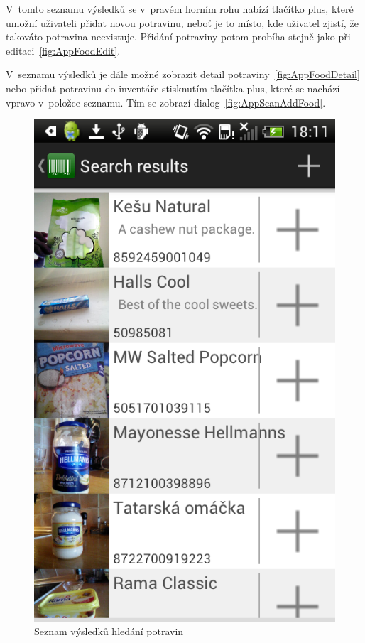 \documentclass[thesis=B,czech]{FITthesis}[2013/10/20]
\begin{document}
V~tomto seznamu výsledků se v~pravém horním rohu nabízí tlačítko plus, které umožní uživateli přidat novou potravinu, neboť je to místo, kde uživatel zjistí, že takováto potravina neexistuje. Přidání potraviny potom probíha stejně jako při editaci~\ref{fig:AppFoodEdit}.

V~seznamu výsledků je dále možné zobrazit detail potraviny~\ref{fig:AppFoodDetail} nebo přidat potravinu do inventáře stisknutím tlačítka plus, které se nachází vpravo v~položce seznamu. Tím se zobrazí dialog~\ref{fig:AppScanAddFood}.

\begin{figure}[H]
  \centering
  \includegraphics[scale=0.4]{screenshots/app_search_results.png}
  \caption{Seznam výsledků hledání potravin}
  \label{fig:AppSearchResults}
\end{figure}
\end{document}
